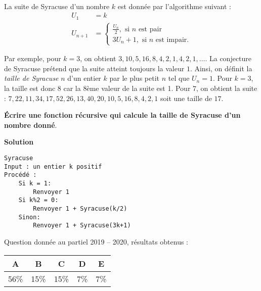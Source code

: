 
\begin{exercice}[2019 -- 2020]~

La suite de Syracuse d'un nombre $k$ est donnée par l'algorithme suivant :
\begin{align*}
U_1 &= k \\
U_{n+1} &= \begin{cases}
\frac{U_n}{2}, \text{ si }n\text{ est pair}\\
3U_n + 1, \text{ si }n\text{ est impair}.
\end{cases}
\end{align*}

Par exemple, pour $k = 3$, on obtient $3, 10, 5, 16, 8, 4, 2, 1, 4, 2, 1, \dots$. La conjecture de Syracuse prétend que la suite atteint toujours la valeur $1$. Ainsi, on définit la \emph{taille de Syracuse} $n$ d'un entier $k$ par le plus petit $n$ tel que $U_n = 1$. Pour $k = 3$, la taille est donc 8 car la 8ème valeur de la suite est 1. Pour $7$, on obtient la suite : $7, 22, 11, 34, 17, 52, 26,
13,
40,
20,
10,
5,
16,
8,
4,
2,1$ soit une taille de $17$.

\textbf{\'Ecrire une fonction récursive qui calcule la taille de Syracuse d'un nombre donné}.


\textbf{Solution}

\begin{lstlisting}
Syracuse
Input : un entier k positif
Procédé :
    Si k = 1:
        Renvoyer 1
    Si k%2 = 0:
        Renvoyer 1 + Syracuse(k/2)
    Sinon:
        Renvoyer 1 + Syracuse(3k+1)
\end{lstlisting}



Question donnée au partiel 2019 -- 2020, résultats obtenus :

\begin{tabular}{|c|c|c|c|c|}
\hline
A & B & C & D & E \\ \hline
56\% & 15\% & 15\% & 7\% & 7\% \\ \hline
\end{tabular}
\end{exercice}
